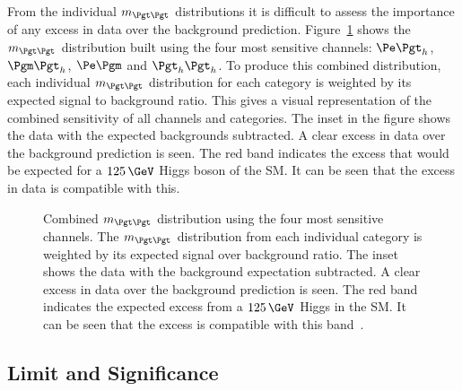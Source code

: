 From the individual $m_{\Pgt\Pgt}$ distributions it is difficult to assess the
importance of any excess in data over the background prediction.
Figure~\ref{fig:combinedmass} shows the $m_{\Pgt\Pgt}$ distribution built using
the four most sensitive channels: $\etau$, $\mutau$, $\emu$ and $\tautau$. To
produce this combined distribution, each individual $m_{\Pgt\Pgt}$ distribution
for each category is weighted by its expected signal to background ratio. This
gives a visual representation of the combined sensitivity of all channels and
categories. The inset in the figure shows the data with the expected backgrounds
subtracted. A clear excess in data over the background prediction is seen. The
red band indicates the excess that would be expected for a $125\,\GeV$ Higgs
boson of the \ac{SM}. It can be seen that the excess in data is compatible with
this.

\begin{figure}[h!]
\caption[Combined $m_{\Pgt\Pgt}$ distribution using the four most sensitive
channels.]{Combined $m_{\Pgt\Pgt}$ distribution using the four most sensitive
channels. The $m_{\Pgt\Pgt}$ distribution from each individual category is
weighted by its expected signal over background ratio. The inset shows the data
with the background expectation subtracted. A clear excess in data over the
background prediction is seen. The red band indicates the expected excess from a
$125\,\GeV$ Higgs in the \ac{SM}. It can be seen that the excess is compatible
with this band~\cite{HIG-13-004}. }
\label{fig:combinedmass}
\end{figure}


\subsection{Limit and Significance}
\label{sec:significance}

